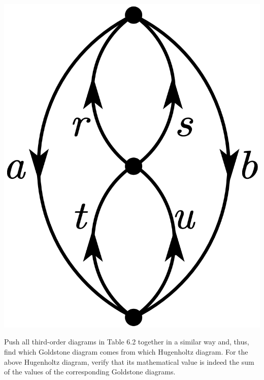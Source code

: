 \documentclass[a4paper]{book}
\newcounter{exercise}[chapter]
\begin{document}
\begin{exercise}
	\begin{center}
	\includegraphics[scale=1.0]{./pictures/6.12/exercise_2.png}
	\end{center}
	
	Push all third-order diagrams in Table 6.2 together in a similar way and, thus, find which Goldstone diagram comes from which Hugenholtz diagram. For the above Hugenholtz diagram, verify that its mathematical value is indeed the sum of the values of the corresponding Goldstone diagrams.
	
	\end{exercise}
	
\end{document}
